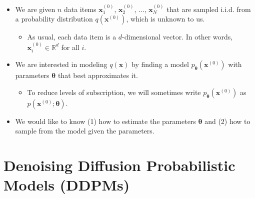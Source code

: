 \documentclass[10pt]{article}
\newcommand{\ve}[1]{\mathbf{#1}}
\newcommand{\Real}{\mathbb{R}}
\begin{document}
\begin{itemize}
  \item We are given $n$ data items $\ve{x}_1^{(0)}$, $\ve{x}_2^{(0)}$, $\dotsc$, $\ve{x}_N^{(0)}$ that are sampled i.i.d. from a probability distribution $q(\ve{x}^{(0)})$, which is unknown to us.
  \begin{itemize}
    \item As usual, each data item is a $d$-dimensional vector. In other words, $\ve{x}^{(0)}_i \in \Real^d$ for all $i$. 
  \end{itemize}
  
  \item We are interested in modeling $q(\ve{x})$ by finding a model $p_{\boldsymbol{\theta}}(\ve{x}^{(0)})$ with parameters $\boldsymbol{\theta}$ that best approximates it.
  \begin{itemize}
    \item To reduce levels of subscription, we will sometimes write $p_{\boldsymbol{\theta}}(\ve{x}^{(0)})$ as $p(\ve{x}^{(0)};\boldsymbol{\theta})$.
  \end{itemize}
   
  \item We would like to know (1) how to estimate the parameters $\boldsymbol{\theta}$ and (2) how to sample from the model given the parameters.
\end{itemize}

\section{Denoising Diffusion Probabilistic Models (DDPMs)}
\end{document}
